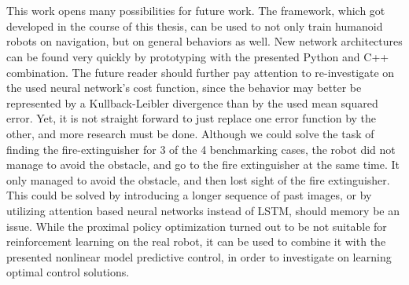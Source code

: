 \\\\
This work opens many possibilities for future work. The framework, which got developed in the course of this thesis, can be used to not only train humanoid robots on navigation, but on general behaviors as well. New network architectures can be found very quickly by prototyping with the presented Python and C++ combination. The future reader should further pay attention to re-investigate on the used neural network's cost function, since the behavior may better be represented by a Kullback-Leibler divergence than by the used mean squared error. Yet, it is not straight forward to just replace one error function by the other, and more research must be done. Although we could solve the task of finding the fire-extinguisher for 3 of the 4 benchmarking cases, the robot did not manage to avoid the obstacle, and go to the fire extinguisher at the same time. It only managed to avoid the obstacle, and then lost sight of the fire extinguisher. This could be solved by introducing a longer sequence of past images, or by utilizing attention based neural networks instead of LSTM, should memory be an issue. While the proximal policy optimization turned out to be not suitable for reinforcement learning on the real robot, it can be used to combine it with the presented nonlinear model predictive control, in order to investigate on learning optimal control solutions.